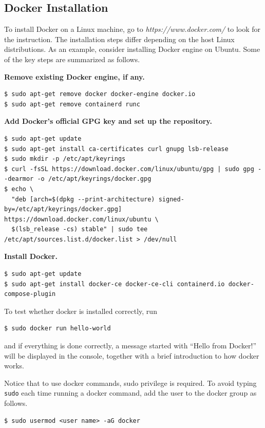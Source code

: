 \subsection{Docker Installation}

To install Docker on a Linux machine, go to \textit{https://www.docker.com/} to look for the instruction. The installation steps differ depending on the host Linux distributions. As an example, consider installing Docker engine on Ubuntu. Some of the key steps are summarized as follows.

\vspace{0.1in}
\noindent \textbf{Remove existing Docker engine, if any.}
\begin{lstlisting}
$ sudo apt-get remove docker docker-engine docker.io
$ sudo apt-get remove containerd runc
\end{lstlisting}

\vspace{0.1in}
\noindent \textbf{Add Docker's official GPG key and set up the repository.}
\begin{lstlisting}
$ sudo apt-get update
$ sudo apt-get install ca-certificates curl gnupg lsb-release
$ sudo mkdir -p /etc/apt/keyrings
$ curl -fsSL https://download.docker.com/linux/ubuntu/gpg | sudo gpg --dearmor -o /etc/apt/keyrings/docker.gpg
$ echo \
  "deb [arch=$(dpkg --print-architecture) signed-by=/etc/apt/keyrings/docker.gpg] https://download.docker.com/linux/ubuntu \
  $(lsb_release -cs) stable" | sudo tee /etc/apt/sources.list.d/docker.list > /dev/null
\end{lstlisting}

\vspace{0.1in}
\noindent \textbf{Install Docker.}
\begin{lstlisting}
$ sudo apt-get update
$ sudo apt-get install docker-ce docker-ce-cli containerd.io docker-compose-plugin
\end{lstlisting}

To test whether docker is installed correctly, run
\begin{lstlisting}
$ sudo docker run hello-world
\end{lstlisting}
and if everything is done correctly, a message started with ``Hello from Docker!'' will be displayed in the console, together with a brief introduction to how docker works.

Notice that to use docker commands, sudo privilege is required. To avoid typing \verb|sudo| each time running a docker command, add the user to the docker group as follows.
\begin{lstlisting}
$ sudo usermod <user name> -aG docker
\end{lstlisting}

